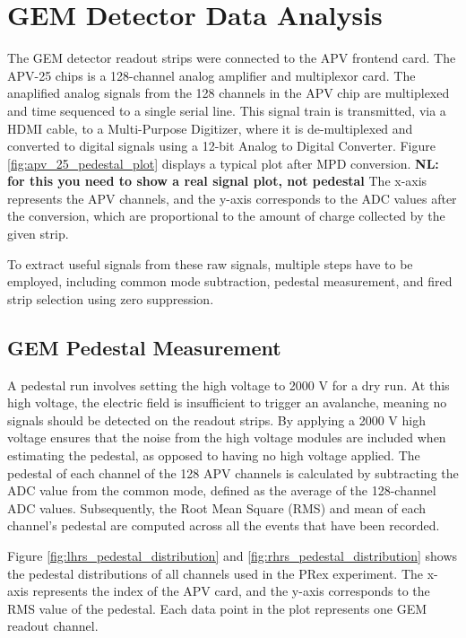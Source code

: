 \section{GEM Detector Data Analysis}

The GEM detector readout strips were connected to the APV frontend card. The APV-25 chips is  a 128-channel analog amplifier and multiplexor card. The anaplified analog signals from the 128 channels in the APV chip are multiplexed and time sequenced to a single serial line. This signal train is   transmitted,  via a HDMI cable,  to a Multi-Purpose Digitizer, where it is de-multiplexed and converted to digital signals using a 12-bit Analog to Digital Converter. Figure \ref{fig:apv_25_pedestal_plot} displays a typical plot after MPD conversion. {\bf NL: for this you need to show  a real signal plot, not pedestal} The x-axis represents the APV channels, and the y-axis corresponds to the ADC values after the conversion, which are proportional to the amount  of charge collected by the given strip.

To extract useful signals from these raw signals, multiple steps have to be  employed, including common mode subtraction, pedestal measurement, and fired strip selection using zero suppression.

\subsection{GEM Pedestal Measurement}

A pedestal run involves setting the high voltage to 2000 V for a dry run. At this high voltage, the electric field is insufficient to trigger an avalanche, meaning no signals should be detected on the readout strips. By applying a 2000 V high voltage ensures that  the noise from the high voltage modules  are included  when estimating the pedestal, as opposed to having no high voltage applied. The pedestal of each channel of the 128 APV channels is calculated by subtracting the ADC value from the common mode, defined as the average of the 128-channel ADC values. Subsequently, the Root Mean Square (RMS) and mean of each channel's pedestal are computed across all the events that have been recorded.

Figure \ref{fig:lhrs_pedestal_distribution} and \ref{fig:rhrs_pedestal_distribution} shows the pedestal distributions of all  channels used in the PRex experiment. The x-axis represents the index of the APV card, and the y-axis corresponds to the RMS value of the pedestal. Each data point in the plot represents one GEM readout channel.


